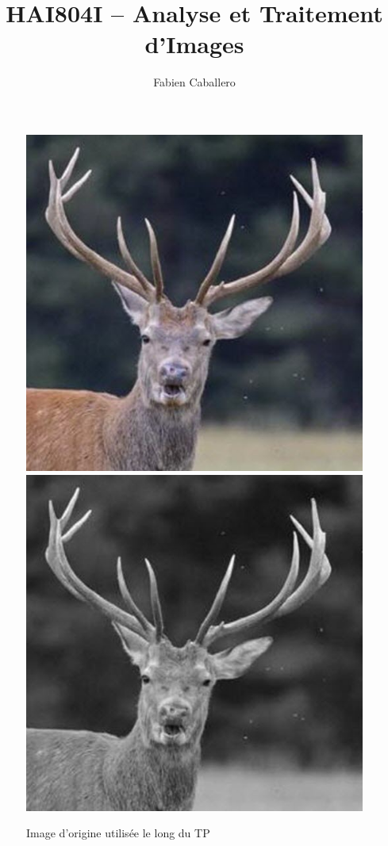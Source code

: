 \documentclass{article}
\title{HAI804I – Analyse et Traitement d'Images}
\author{Fabien Caballero }
\begin{document}
\maketitle
    \tableofcontents

\newpage

\begin{figure}[h]
\centerline{\includegraphics[scale=0.4]{./rendus/cerf.png}  \includegraphics[scale=0.4]{./rendus/cerfgris.png}}
\caption{Image d'origine utilisée le long du TP}
\end{figure}
\end{document}
